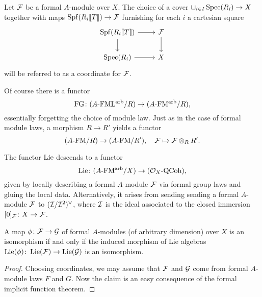 \documentclass[../main.tex]{subfiles}
\begin{document}
\begin{defi}[Coordinate]
  Let $\mathcal{F}$ be a formal $A$-module over $X$. The choice of a cover $\sqcup_{i
  \in I} \operatorname{Spec}(R_i) \to X$ together with maps $\operatorname{Spf}(R_i \llbracket T \rrbracket) \to \mathcal{F}$
  furnishing for each $i$ a cartesian square
  \begin{equation*}
  \begin{tikzcd}[ampersand replacement=\&]
  	{\spf(R_i \llbr T \rrbr)} \& \cF \\
  	{\spec(R_i)} \& X
  	\arrow[from=1-1, to=1-2]
  	\arrow[from=1-1, to=2-1]
  	\arrow[from=1-2, to=2-2]
  	\arrow[from=2-1, to=2-2]
  \end{tikzcd}
  \end{equation*}
  will be referred to as a coordinate for $\mathcal{F}$. 
\end{defi}

Of course there is a functor 
\begin{equation*}
  \textnormal{FG}\colon  {({A}\text-\allowbreak\mathrm{FML^{arb}}/{R})} \to {({A}\text-\allowbreak\mathrm{FM^{arb}}/{R})},
\end{equation*}
essentially forgetting the choice of module law. Just as in the case of formal 
module laws, a morphism $R \to R'$ yields a functor 
\begin{equation*} 
  {({A}\text-\allowbreak\mathrm{FM}/{R})} \to {({A}\text-\allowbreak\mathrm{FM}/{R'})}, \quad \mathcal{F} \mapsto \mathcal{F} \otimes_R R'.
\end{equation*}

\begin{defi}
  The functor $\operatorname{Lie}$ descends to a functor 
  \begin{equation*}
    \operatorname{Lie}\colon  {({A}\text-\allowbreak\mathrm{FM^{arb}}/{X})} \to {({\mathcal{O}_X}\text-\allowbreak\mathrm{QCoh})}, 
  \end{equation*}
  given by locally describing a formal $A$-module $\mathcal{F}$ via formal group laws and gluing the local data. Alternatively, it arises from sending 
  sending a formal $A$-module $\mathcal{F}$ to $(\mathcal{I} / \mathcal{I}^2)^\vee$, where $\mathcal{I}$ is the
  ideal associated to the closed immersion $[0]_{\mathcal{F}}\colon  X \to \mathcal{F}$. 
\end{defi}

\begin{lem}\label{lem:IsosCheckOnLie}
  A map $\phi\colon  \mathcal{F} \to \mathcal{G}$ of formal $A$-modules (of arbitrary dimension) over $X$ is an isomorphism if and only if the induced morphism of Lie algebras $\operatorname{Lie}(\phi)\colon  \operatorname{Lie}(\mathcal{F}) \to \operatorname{Lie}(\mathcal{G})$ is an isomorphism.
\begin{proof}
  Choosing coordinates, we may assume that $\mathcal{F}$ and $\mathcal{G}$ come from formal $A$-module
  laws $F$ and $G$. Now the claim is an easy consequence of the formal implicit
  function theorem.
\end{proof}
\end{lem}
\end{document}
